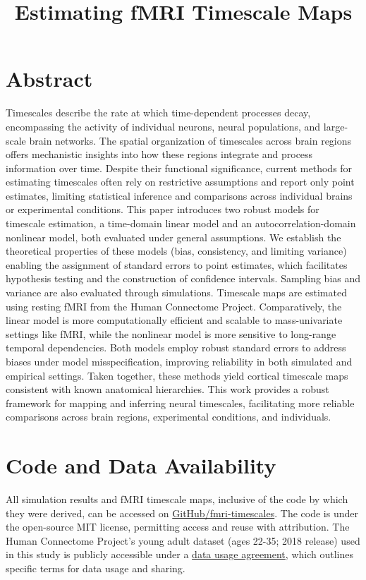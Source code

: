 \documentclass[9pt]{article}
\title{Estimating fMRI Timescale Maps}
\date{}
\begin{document}
\maketitle

\section*{Abstract}
Timescales describe the rate at which time-dependent processes decay, encompassing the activity of individual neurons, neural populations, and large-scale brain networks. The spatial organization of timescales across brain regions offers mechanistic insights into how these regions integrate and process information over time. Despite their functional significance, current methods for estimating timescales often rely on restrictive assumptions and report only point estimates, limiting statistical inference and comparisons across individual brains or experimental conditions. This paper introduces two robust models for timescale estimation, a time-domain linear model and an autocorrelation-domain nonlinear model, both evaluated under general assumptions. We establish the theoretical properties of these models (bias, consistency, and limiting variance) enabling the assignment of standard errors to point estimates, which facilitates hypothesis testing and the construction of confidence intervals. Sampling bias and variance are also evaluated through simulations. Timescale maps are estimated using resting fMRI from the Human Connectome Project. Comparatively, the linear model is more computationally efficient and scalable to mass-univariate settings like fMRI, while the nonlinear model is more sensitive to long-range temporal dependencies. Both models employ robust standard errors to address biases under model misspecification, improving reliability in both simulated and empirical settings. Taken together, these methods yield cortical timescale maps consistent with known anatomical hierarchies. This work provides a robust framework for mapping and inferring neural timescales, facilitating more reliable comparisons across brain regions, experimental conditions, and individuals.






\section{Code and Data Availability}
All simulation results and fMRI timescale maps, inclusive of the code by which they were derived, can be accessed on \href{https://github.com/griegner/fmri-timescales}{GitHub/fmri-timescales}. The code is under the open-source MIT license, permitting access and reuse with attribution. The Human Connectome Project's young adult dataset (ages 22-35; 2018 release) used in this study is publicly accessible under a \href{https://www.humanconnectome.org/storage/app/media/data_use_terms/DataUseTerms-HCP-Open-Access-26Apr2013.pdf}{data usage agreement}, which outlines specific terms for data usage and sharing.


\end{document}
